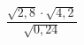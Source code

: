 \begin{ex}[type=calculate]
	\begin{condition}
		\( \dfrac{\sqrt{2,8} \cdot \sqrt{4,2}}{\sqrt{0,24}} \)
	\end{condition}
\end{ex}